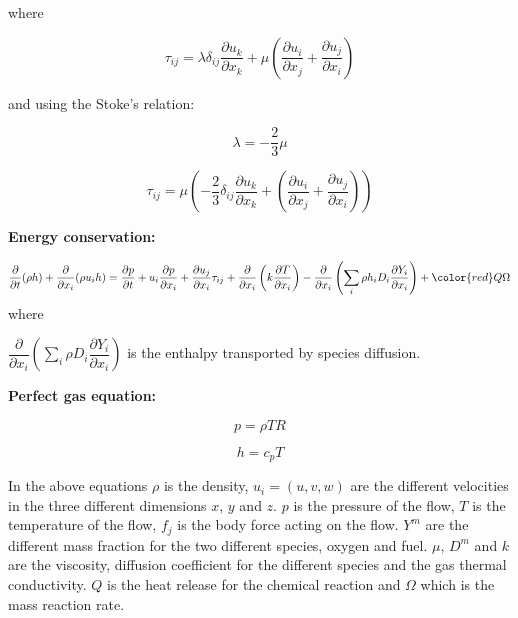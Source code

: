 where 

\begin{equation} 
\tau_{ij}=\lambda \delta_{ij}\frac{\partial u_k}{\partial x_k}+
\mu\left(\frac{\partial u_i}{\partial x_j}+\frac{\partial u_j}{\partial x_i}\right)
\end{equation} 

and using the Stoke's relation: 

\begin{equation} 
\lambda=-\frac{2}{3}\mu
\end{equation} 

\begin{equation} 
\tau_{ij}=
\mu\left(
-\frac{2}{3} \delta_{ij}\frac{\partial u_k}{\partial x_k}+
\left(\frac{\partial u_i}{\partial x_j}+\frac{\partial u_j}{\partial x_i}\right)
\right)
\end{equation} 

\textbf{Energy conservation:}

\begin{equation} 
\frac{\partial}{\partial t}(\rho h)+
\frac{\partial}{\partial x_i}(\rho u_i h)
=
\frac{\partial p}{\partial t}
+
u_i\frac{\partial p}{\partial x_i}
+
\frac{\partial u_j}{\partial x_i}\tau_{ij}
+
\frac{\partial}{\partial x_i}\left(k\frac{\partial T}{\partial x_i}\right)
-
\frac{\partial}{\partial x_i}
\left(
\sum_i\rho h_iD_i\frac{\partial Y_i}{\partial x_i}
\right)
+
{\color{red}
Q\Omega
}
\end{equation} 
where 

$\dfrac{\partial}{\partial x_i}
\left(
\sum_i\rho D_i\dfrac{\partial Y_i}{\partial x_i}
\right)$ is the 
enthalpy transported by species diffusion.

\textbf{Perfect gas equation:}

\begin{equation} 
p=\rho T R
\end{equation} 

\begin{equation}
h=c_pT
\end{equation} 

In the above equations $\rho$ is the density, $u_i=(u,v,w)$ 
are the different velocities in the three different dimensions $x$, $y$ and $z$.
$p$ is the pressure of the flow, $T$ is the temperature of the flow, $f_j$ 
is the body force acting on the flow.
$Y^m$ are the different mass fraction for the two different species, oxygen and fuel.
$\mu$, $D^{m}$ and $k$ are the viscosity, diffusion coefficient for the different 
species and the gas thermal conductivity.  $Q$ is the heat release for the chemical reaction and
$\Omega$ which is the mass reaction rate. 

